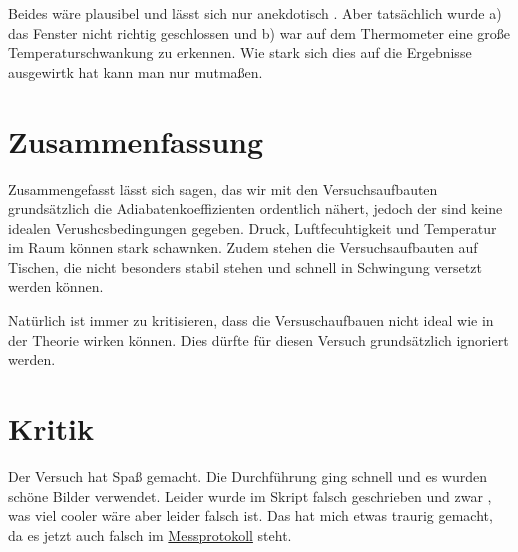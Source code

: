 Beides wäre plausibel und lässt sich nur anekdotisch . Aber tatsächlich wurde a) das Fenster nicht richtig geschlossen und b) war auf dem Thermometer eine große Temperaturschwankung zu erkennen. Wie stark sich dies auf die Ergebnisse ausgewirtk hat kann man nur mutmaßen.

\section{Zusammenfassung}
\label{sec:Zusammenfassung}

Zusammengefasst lässt sich sagen, das wir mit den Versuchsaufbauten grundsätzlich die Adiabatenkoeffizienten ordentlich nähert, jedoch der sind keine idealen Verushcsbedingungen gegeben. Druck, Luftfecuhtigkeit und Temperatur im Raum können stark schawnken. Zudem stehen die Versuchsaufbauten auf Tischen, die nicht besonders stabil stehen und schnell in Schwingung versetzt werden können.

Natürlich ist immer zu kritisieren, dass die Versuschaufbauen nicht ideal wie in der Theorie wirken können. Dies dürfte für diesen Versuch grundsätzlich ignoriert werden.


\section{Kritik}
\label{sec:Kritik}

Der Versuch hat Spaß gemacht. Die Durchführung ging schnell und es wurden schöne Bilder verwendet. Leider wurde im Skript  falsch geschrieben und zwar , was viel cooler wäre aber leider falsch ist. Das hat mich etwas traurig gemacht, da es jetzt auch falsch im \hyperref[ch:Protokoll]{Messprotokoll} steht.